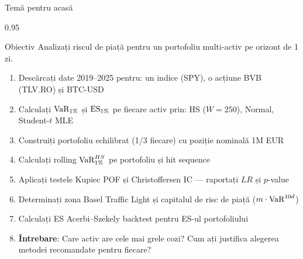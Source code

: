 \documentclass[9pt, aspectratio=169, t]{beamer}
\begin{document}
\begin{frame}[shrink=10]{Temă pentru acasă}
\begin{cminipage}{0.95\textwidth}
    \begin{block}{Obiectiv}
    Analizați riscul de piață pentru un portofoliu multi-activ pe orizont de 1 zi.
    \end{block}
    \begin{enumerate}\setlength{\itemsep}{0pt}
        \item Descărcați date 2019--2025 pentru: un indice (SPY), o acțiune BVB (TLV.RO) și BTC-USD
        \item Calculați $\text{VaR}_{1\%}$ și $\text{ES}_{1\%}$ pe fiecare activ prin: HS ($W=250$), Normal, Student-$t$ MLE
        \item Construiți portofoliu echilibrat (1/3 fiecare) cu poziție nominală 1M EUR
        \item Calculați rolling $\text{VaR}^{HS}_{1\%}$ pe portofoliu și hit sequence
        \item Aplicați testele Kupiec POF și Christoffersen IC --- raportați $LR$ și $p$-value
        \item Determinați zona Basel Traffic Light și capitalul de risc de piață ($m \cdot \text{VaR}^{10d}$)
        \item Calculați ES Acerbi--Szekely backtest pentru ES-ul portofoliului
        \item \textbf{Întrebare}: Care activ are cele mai grele cozi? Cum ați justifica alegerea metodei recomandate pentru fiecare?
    \end{enumerate}
\end{cminipage}
\end{frame}
\end{document}
